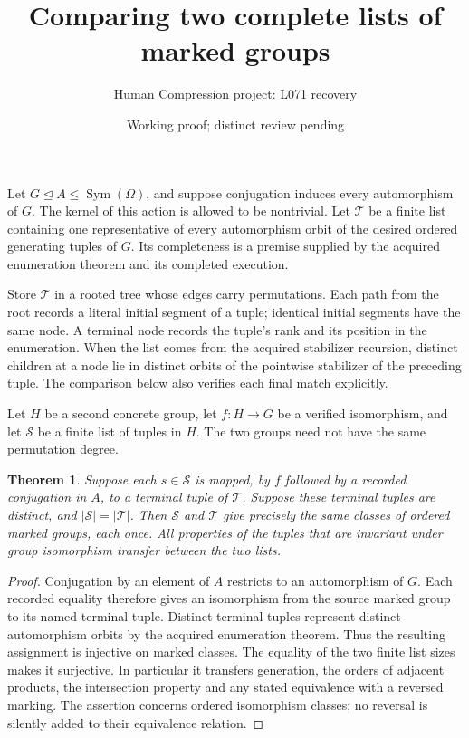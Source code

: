 \documentclass[11pt,a4paper]{article}
\title{Comparing two complete lists of marked groups}
\author{Human Compression project: L071 recovery}
\date{Working proof; distinct review pending}
\newtheorem{theorem}{Theorem}
\begin{document}
\maketitle
Let $G\trianglelefteq A\le\operatorname{Sym}(\Omega)$, and suppose
conjugation induces every automorphism of $G$. The kernel of this action
is allowed to be nontrivial. Let $\mathcal T$ be a finite list containing
one representative of every automorphism orbit of the desired ordered
generating tuples of $G$. Its completeness is a premise supplied by the
acquired enumeration theorem and its completed execution.

Store $\mathcal T$ in a rooted tree whose edges carry permutations.
Each path from the root records a literal initial segment of a tuple;
identical initial segments have the same node. A terminal node records
the tuple's rank and its position in the enumeration. When the list comes
from the acquired stabilizer recursion, distinct children at a node lie
in distinct orbits of the pointwise stabilizer of the preceding tuple.
The comparison below also verifies each final match explicitly.

Let $H$ be a second concrete group, let $f:H\longrightarrow G$ be a
verified isomorphism, and let $\mathcal S$ be a finite list of tuples
in $H$. The two groups need not have the same permutation degree.

\begin{theorem}
Suppose each $s\in\mathcal S$ is mapped, by $f$ followed by a recorded
conjugation in $A$, to a terminal tuple of $\mathcal T$. Suppose these
terminal tuples are distinct, and $|\mathcal S|=|\mathcal T|$.
Then $\mathcal S$ and $\mathcal T$ give precisely the same classes
of ordered marked groups, each once. All properties of the tuples that
are invariant under group isomorphism transfer between the two lists.
\end{theorem}
\begin{proof}
Conjugation by an element of $A$ restricts to an automorphism of $G$.
Each recorded equality therefore gives an isomorphism from the source
marked group to its named terminal tuple. Distinct terminal tuples
represent distinct automorphism orbits by the acquired enumeration
theorem. Thus the resulting assignment is injective on marked classes.
The equality of the two finite list sizes makes it surjective. In
particular it transfers generation, the orders of adjacent products,
the intersection property and any stated equivalence with a reversed
marking. The assertion concerns ordered isomorphism classes; no reversal
is silently added to their equivalence relation.
\end{proof}
\end{document}
